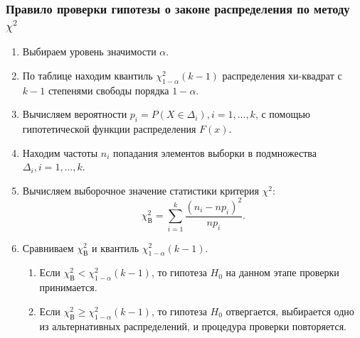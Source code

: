 \documentclass[a4paper]{article}
\begin{document}
\subsubsection*{Правило проверки гипотезы о законе распределения по методу $\chi^2$}
\begin{enumerate}
    \item Выбираем уровень значимости $\alpha$.
    \item По таблице \cite[с. 572-573]{book1} находим квантиль $\chi_{1-\alpha}^2(k-1)$ распределения хи-квадрат с $k-1$ степенями свободы порядка $1-\alpha$.
    \item Вычисляем вероятности $p_i=P(X\in\Delta_i), i = 1,...,k$, с помощью гипотетической функции распределения $F(x)$.
    \item Находим частоты $n_i$ попадания элементов выборки в подмножества $\Delta_i,i=1,...,k$.
    \item Вычисляем выборочное значение статистики критерия $\chi^2$:
        \begin{equation*}
            \chi^2_{\text{В}}=\sum_{i=1}^k\frac{(n_i-np_i)^2}{np_i}.
        \end{equation*}
    \item Сравниваем $\chi^2_{\text{В}}$ и квантиль $\chi_{1-\alpha}^2(k-1)$.
        \begin{enumerate}
            \item Если $\chi^2_{\text{В}}<\chi_{1-\alpha}^2(k-1)$, то гипотеза $H_0$ на данном этапе проверки принимается.
            \item Если $\chi^2_{\text{В}}\geq\chi_{1-\alpha}^2(k-1)$, то гипотеза $H_0$ отвергается, выбирается одно из альтернативных распределений, и процедура проверки повторяется.

        \end{enumerate}
\end{enumerate}
\end{document}
